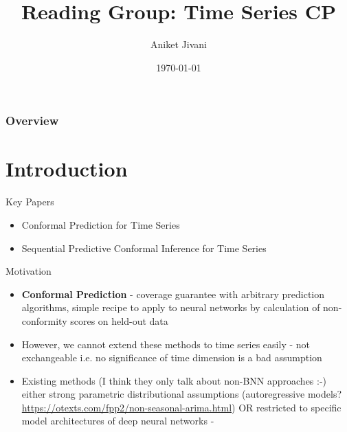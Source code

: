 \documentclass[usenames,dvipsnames]{beamer}
\title[Journal Club]{Reading Group: Time Series CP} %
\author[Aniket Jivani]{Aniket Jivani}
\institute[U-M]{University of Michigan}
\date{\today}
\theoremstyle{definition}
\begin{document}
\begin{frame}
\titlepage %
\end{frame}



\begin{frame}
 \frametitle{Overview} %
 \tableofcontents %
\end{frame}

\section{Introduction}
\begin{frame}{Key Papers}
    \begin{itemize}
        \item Conformal Prediction for Time Series \cite{xu_conformal_2023}

        \item Sequential Predictive Conformal Inference for Time Series \cite{pmlr-v202-xu23r}
    \end{itemize}
\end{frame}

\begin{frame}{Motivation}
    \begin{itemize}
        \item \textbf{Conformal Prediction} - coverage guarantee with arbitrary prediction algorithms, simple recipe to apply to neural networks by calculation of non-conformity scores on held-out data

        \item However, we cannot extend these methods to time series easily - not exchangeable i.e. no significance of time dimension is a bad assumption

        \item Existing methods (I think they only talk about non-BNN approaches :-) either strong parametric distributional assumptions (autoregressive models? \url{https://otexts.com/fpp2/non-seasonal-arima.html}) OR restricted to specific model architectures of deep neural networks - \cite{wen_multi-horizon_2017} 
    \end{itemize}
\end{frame}
\end{document}
